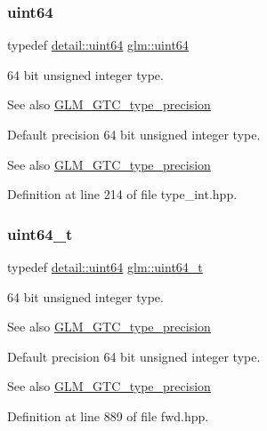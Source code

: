 \subsubsection{\texorpdfstring{uint64}{uint64}}
{\footnotesize\ttfamily typedef \mbox{\hyperlink{namespaceglm_1_1detail_adec4b19bf4982125e122db2fe03c5810}{detail\+::uint64}} \mbox{\hyperlink{group__gtc__type__precision_gae3632bf9b37da66233d78930dd06378a}{glm\+::uint64}}}

64 bit unsigned integer type. \begin{DoxySeeAlso}{See also}
\mbox{\hyperlink{group__gtc__type__precision}{G\+L\+M\+\_\+\+G\+T\+C\+\_\+type\+\_\+precision}}
\end{DoxySeeAlso}
Default precision 64 bit unsigned integer type. \begin{DoxySeeAlso}{See also}
\mbox{\hyperlink{group__gtc__type__precision}{G\+L\+M\+\_\+\+G\+T\+C\+\_\+type\+\_\+precision}} 
\end{DoxySeeAlso}


Definition at line 214 of file type\+\_\+int.\+hpp.

\mbox{\label{group__gtc__type__precision_ga058f57c19e1befdcf12498944bd73e69}} 
\subsubsection{\texorpdfstring{uint64\_t}{uint64\_t}}
{\footnotesize\ttfamily typedef \mbox{\hyperlink{namespaceglm_1_1detail_adec4b19bf4982125e122db2fe03c5810}{detail\+::uint64}} \mbox{\hyperlink{group__gtc__type__precision_ga058f57c19e1befdcf12498944bd73e69}{glm\+::uint64\+\_\+t}}}

64 bit unsigned integer type. \begin{DoxySeeAlso}{See also}
\mbox{\hyperlink{group__gtc__type__precision}{G\+L\+M\+\_\+\+G\+T\+C\+\_\+type\+\_\+precision}}
\end{DoxySeeAlso}
Default precision 64 bit unsigned integer type. \begin{DoxySeeAlso}{See also}
\mbox{\hyperlink{group__gtc__type__precision}{G\+L\+M\+\_\+\+G\+T\+C\+\_\+type\+\_\+precision}} 
\end{DoxySeeAlso}


Definition at line 889 of file fwd.\+hpp.

\mbox{\label{group__gtc__type__precision_ga1a7dcd8aac97cc8020817c94049deff2}} 
